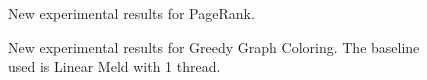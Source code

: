 \documentclass[10pt]{article}
\begin{document}
\begin{figure}[h]
\begin{center}
\end{center}
\caption{New experimental results for PageRank.}
\label{fig:res1}
\end{figure}

\begin{figure}[h]
\begin{center}
\end{center}
\caption{New experimental results for Greedy Graph Coloring. The baseline used
   is Linear Meld with 1 thread.}
\label{fig:res2}
\end{figure}
\end{document}
